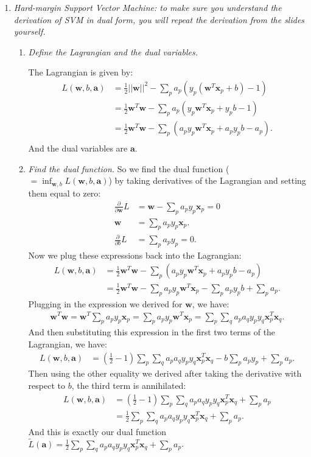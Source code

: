 \documentclass[12pt,oneside,reqno]{amsart}
\theoremstyle{plain}
\theoremstyle{definition}
\theoremstyle{remark}
\newcommand{\vecc}{\mathbf}
\newcommand{\bee}{\begin{equation}\begin{aligned}}
\newcommand{\eee}{\end{aligned}\end{equation}}
\newcommand{\fracc}{\frac}
\newcommand{\lpar}{\left(}
\newcommand{\rpar}{\right)}
\begin{document}
\begin{enumerate}[label=\arabic*.]
\item \textit{Hard-margin Support Vector Machine: to make sure you understand the derivation of SVM in dual form, you will repeat the derivation from the slides yourself. }

\begin{enumerate}
\item \textit{Define the Lagrangian and the dual variables. }

The Lagrangian is given by:
\bee
L(\vecc{w},b,\vecc{a}) &= \fracc{1}{2}||\vecc{w}||^2 - \sum_p a_p (y_p(\vecc{w}^T\vecc{x}_p + b) - 1)\\
&= \fracc{1}{2}\vecc{w}^T\vecc{w} - \sum_p a_p (y_p\vecc{w}^T\vecc{x}_p + y_pb - 1)\\
&= \fracc{1}{2}\vecc{w}^T\vecc{w} - \sum_p \lpar a_py_p\vecc{w}^T\vecc{x}_p + a_py_pb - a_p\rpar. \\
\eee
And the dual variables are $\vecc{a}$. 

\item \textit{Find the dual function. }
So we find the dual function ($= \inf_{\vecc{w},b}L(\vecc{w},b,\vecc{a})$) by taking derivatives of the Lagrangian and setting them equal to zero:
\bee
\fracc{\partial}{\partial\vecc{w}}L &= \vecc{w} - \sum_p a_py_p\vecc{x}_p = 0\\
\vecc{w} &= \sum_p a_py_p\vecc{x}_p.\\
\fracc{\partial}{\partial b}L &= \sum_p a_py_p = 0.
\eee
Now we plug these expressions back into the Lagrangian:
\bee
L(\vecc{w},b,\vecc{a}) &= \fracc{1}{2}\vecc{w}^T\vecc{w} - \sum_p \lpar a_py_p\vecc{w}^T\vecc{x}_p + a_py_pb - a_p\rpar\\
&= \fracc{1}{2}\vecc{w}^T\vecc{w} - \sum_p  a_py_p\vecc{w}^T\vecc{x}_p -\sum_p a_py_pb +\sum_p a_p.
\eee
Plugging in the expression we derived for $\vecc{w}$, we have:
\bee
\vecc{w}^T\vecc{w} = \vecc{w}^T\sum_p a_py_p\vecc{x}_p = \sum_p  a_py_p\vecc{w}^T\vecc{x}_p = \sum_p\sum_qa_pa_qy_py_q\vecc{x}_p^T\vecc{x}_q.
\eee
And then substituting this expression in the first two terms of the Lagrangian, we have:
\bee
L(\vecc{w},b,\vecc{a}) &= \lpar \fracc{1}{2} - 1\rpar \sum_p\sum_qa_pa_qy_py_q\vecc{x}_p^T\vecc{x}_q -b\sum_p a_py_p +\sum_p a_p.
\eee
Then using the other equality we derived after taking the derivative with respect to $b$, the third term is annihilated:
\bee
L(\vecc{w},b,\vecc{a}) &= \lpar \fracc{1}{2} - 1\rpar \sum_p\sum_qa_pa_qy_py_q\vecc{x}_p^T\vecc{x}_q +\sum_p a_p\\
&= \fracc{1}{2}\sum_p\sum_qa_pa_qy_py_q\vecc{x}_p^T\vecc{x}_q +\sum_p a_p. 
\eee
And this is exactly our dual function $\tilde{L}(\vecc{a}) = \fracc{1}{2}\sum_p\sum_qa_pa_qy_py_q\vecc{x}_p^T\vecc{x}_q +\sum_p a_p$. 


\end{enumerate}
\end{enumerate}
\end{document}
